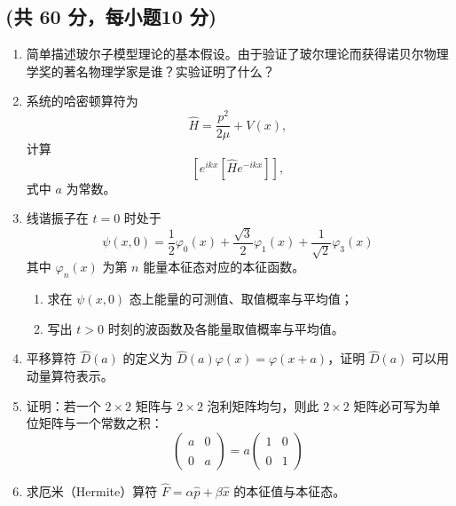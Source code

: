 
\subsection{(共 60 分，每小题10 分)}
\begin{enumerate}
\item 简单描述玻尔子模型理论的基本假设。由于验证了玻尔理论而获得诺贝尔物理学奖的著名物理学家是谁？实验证明了什么？

\item 系统的哈密顿算符为 
$$\hat{H} = \frac{p^2}{2\mu} + V(x),~$$
计算
$$\left[e^{ikx}[\hat{H}e^{-ikx}]\right],~$$
式中 $a$ 为常数。

\item 线谐振子在 $t = 0$ 时处于
$$ \psi(x, 0) = \frac{1}{2}\varphi_0(x) + \frac{\sqrt{3}}{2}\varphi_1(x) + \frac{1}{\sqrt{2}}\varphi_3(x)~ $$
其中 $\varphi_n(x)$ 为第 $n$ 能量本征态对应的本征函数。
\begin{enumerate}
\item 求在 $\psi(x, 0)$ 态上能量的可测值、取值概率与平均值；
\item 写出 $t > 0$ 时刻的波函数及各能量取值概率与平均值。
\end{enumerate}

\item 平移算符 $\hat{D}(a)$ 的定义为 $\hat{D}(a)\varphi(x) = \varphi(x + a)$，证明 $\hat{D}(a)$ 可以用动量算符表示。

\item 证明：若一个 $2 \times 2$ 矩阵与 $2 \times 2$ 泡利矩阵均匀，则此 $2 \times 2$ 矩阵必可写为单位矩阵与一个常数之积：
$$\left( \begin{matrix} a & 0 \\\\ 0 & a \end{matrix} \right) = a \left( \begin{matrix} 1 & 0 \\\\ 0 & 1 \end{matrix} \right)~$$

\item 求厄米（Hermite）算符 $\hat{F} = \alpha\hat{p} + \beta\hat{x}$ 的本征值与本征态。
\end{enumerate}
